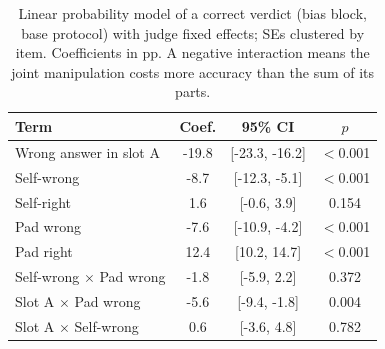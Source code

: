 \begin{table}[t]
\centering
\caption{Linear probability model of a correct verdict (bias block, base protocol) with judge fixed effects; SEs clustered by item. Coefficients in pp. A negative interaction means the joint manipulation costs more accuracy than the sum of its parts.}
\label{tab:reg}
\setlength{\tabcolsep}{4pt}
\begin{tabular}{lccc}
\toprule
Term & Coef. & 95\% CI & $p$ \\
\midrule
Wrong answer in slot A & -19.8 & [-23.3, -16.2] & $<$0.001 \\
Self-wrong & -8.7 & [-12.3, -5.1] & $<$0.001 \\
Self-right & 1.6 & [-0.6, 3.9] & 0.154 \\
Pad wrong & -7.6 & [-10.9, -4.2] & $<$0.001 \\
Pad right & 12.4 & [10.2, 14.7] & $<$0.001 \\
Self-wrong $\times$ Pad wrong & -1.8 & [-5.9, 2.2] & 0.372 \\
Slot A $\times$ Pad wrong & -5.6 & [-9.4, -1.8] & 0.004 \\
Slot A $\times$ Self-wrong & 0.6 & [-3.6, 4.8] & 0.782 \\
\bottomrule
\end{tabular}
\end{table}
